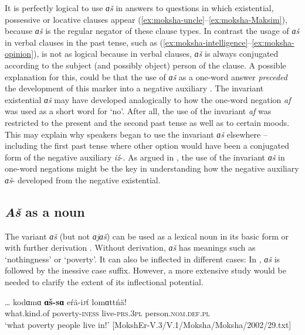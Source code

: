 \documentclass[output=paper]{langsci/langscibook}
\begin{document}
  It is perfectly logical to use \textit{ɑš} in answers to questions in which existential, possessive or locative clauses appear (\ref{ex:moksha-uncle}--\ref{ex:moksha-Maksim}), because \textit{ɑš} is the regular negator of these clause types. In contrast the usage of \textit{ɑš} in verbal clauses in the past tense, such as (\ref{ex:moksha-intelligence}--\ref{ex:moksha-opinion}), is not as logical because in verbal clauses, \textit{ɑš} is always conjugated according to the subject (and possibly object) person of the clause. A possible explanation for this, could be that the use of \textit{ɑš} as a one-word answer \textit{preceded} the development of this marker into a negative auxiliary \citep[272--275]{Hamari2007}. The invariant existential \textit{ɑš} may have developed analogically to how the one-word negation \textit{af} was used as a short word for `no'. After all, the use of the invariant \textit{af} was restricted to the present and the second past tense as well as to certain moods. This may explain why speakers began to use the invariant \textit{ɑš} elsewhere -- including the first past tense where other option would have been a conjugated form of the negative auxiliary \textit{iź}-. As argued in , the use of the invariant \textit{ɑš} in one-word negations might be the key in understanding how the negative auxiliary \textit{ɑš}- developed from the negative existential.

\subsection{\textit{Aš} as a noun}\label{sec:2:5.5}

The variant \textit{ɑš} (but not \textit{ɑjɑš}) can be used as a lexical noun in its basic form or with further derivation \citep[268--270]{Hamari2007}. Without derivation, \textit{ɑš} has meanings such as `nothingness' or `poverty'. It can also be inflected in different cases: In , \textit{ɑš} is followed by the inessive case suffix. However, a more extensive study would be needed to clarify the extent of its inflectional potential. 

\ea\label{ex:moksha-poverty}
\gll \ob\ldots\cb{} kodɑmɑ \textbf{ɑš-sɑ} eŕä-i\textsc{j}ť lomɑttńä!\\
{} what.kind.of poverty-\textsc{iness} live-\textsc{prs.3pl} person.\textsc{nom.def.pl}\\
\glt `what poverty people live in!' [MokshEr-V.3/V.1/Moksha/Moksha/2002/29.txt]
\z
\end{document}
